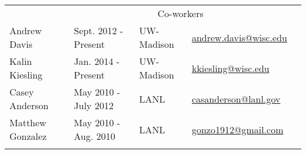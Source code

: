 \begin{longtable}{lllll}
               
				                   

              & \multicolumn{3}{c}{\Large{Co-workers}} &  \\  \vspace{2mm}

	      {Andrew Davis}\label{andy} & {Sept. 2012 - Present} &
	      {UW-Madison} &
	      \href{mailto:andrew.davis@wisc.edu}{andrew.davis@wisc.edu} \\
	      \vspace{2mm}
{Kalin Kiesling}\label{kk} & {Jan. 2014 - Present} & {UW-Madison}  &
	\href{mailto:kkiesling@wisc.edu}{kkiesling@wisc.edu} \\ \vspace{2mm}  %

{Casey Anderson}\label{cas} & {May 2010 - July 2012} & {LANL}&
\href{mailto:casanderson@lanl.com}{casanderson@lanl.gov} \\ \vspace{2mm}%

{Matthew Gonzalez}\label{matt_gonzo} & {May 2010 - Aug. 2010} & {LANL} &
	\href{mailto:gonzo1912@gmail.com}{gonzo1912@gmail.com} \\ \vspace{2mm}%
     


\vspace{-12mm} %
\end{longtable}






%
